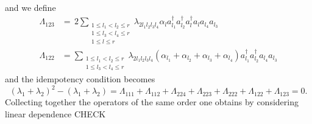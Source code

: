 \documentclass[aps,preprint]{revtex4}%
\begin{document}
and we define
\begin{align}
\Lambda_{123}  &  =\,2\sum_{\substack{1\leq l_{1}<l_{2}\leq r\\1\leq
l_{3}<l_{4}\leq r\\1\leq l\leq r}}\lambda_{2l_{1}l_{2}l_{3}l_{4}}\alpha
_{l}a_{l_{1}}^{\dagger}a_{l_{2}}^{\dagger}a_{l}^{\dagger}a_{l}a_{l_{4}%
}a_{l_{3}}\\
\Lambda_{122}  &  =\sum_{\substack{1\leq l_{1}<l_{2}\leq r\\1\leq l_{3}%
<l_{4}\leq r}}\lambda_{2l_{1}l_{2}l_{3}l_{4}}\left(  \alpha_{l_{1}}%
+\alpha_{l_{2}}+\alpha_{l_{3}}+\alpha_{l_{4}}\right)  a_{l_{1}}^{\dagger
}a_{l_{2}}^{\dagger}a_{l_{4}}a_{l_{3}}%
\end{align}
and the idempotency condition becomes
\[
\left(  \lambda_{1}+\lambda_{2}\right)  ^{2}-\left(  \lambda_{1}+\lambda
_{2}\right)  =\Lambda_{111}+\Lambda_{112}+\Lambda_{224}+\Lambda_{223}%
+\Lambda_{222}+\Lambda_{122}+\Lambda_{123}=0.
\]
Collecting together the operators of the same order one obtains by considering
linear dependence CHECK%
\end{document}
